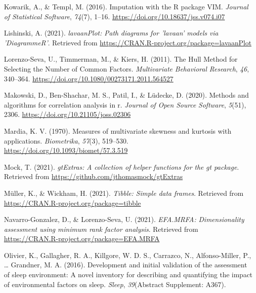 \documentclass[
  english,
  man]{apa6}
\newlength{\cslhangindent}
\newlength{\cslentryspacingunit} %
\newenvironment{CSLReferences}[2] %
 {%
  \setlength{\parindent}{0pt}
  \ifodd #1
  \let\oldpar\par
  \def\par{\hangindent=\cslhangindent\oldpar}
  \fi
  \setlength{\parskip}{#2\cslentryspacingunit}
 }%
 {}
\begin{document}
\begin{CSLReferences}{1}{0}
\leavevmode{}%
Kowarik, A., \& Templ, M. (2016). Imputation with the {R} package {VIM}. \emph{Journal of Statistical Software}, \emph{74}(7), 1--16. \url{https://doi.org/10.18637/jss.v074.i07}

\leavevmode{}%
Lishinski, A. (2021). \emph{lavaanPlot: Path diagrams for 'lavaan' models via 'DiagrammeR'}. Retrieved from \url{https://CRAN.R-project.org/package=lavaanPlot}

\leavevmode{}%
Lorenzo-Seva, U., Timmerman, M., \& Kiers, H. (2011). The {Hull Method} for {Selecting} the {Number} of {Common Factors}. \emph{Multivariate Behavioral Research}, \emph{46}, 340--364. \url{https://doi.org/10.1080/00273171.2011.564527}

\leavevmode{}%
Makowski, D., Ben-Shachar, M. S., Patil, I., \& Lüdecke, D. (2020). Methods and algorithms for correlation analysis in r. \emph{Journal of Open Source Software}, \emph{5}(51), 2306. \url{https://doi.org/10.21105/joss.02306}

\leavevmode{}%
Mardia, K. V. (1970). Measures of multivariate skewness and kurtosis with applications. \emph{Biometrika}, \emph{57}(3), 519--530. \url{https://doi.org/10.1093/biomet/57.3.519}

\leavevmode{}%
Mock, T. (2021). \emph{gtExtras: A collection of helper functions for the gt package}. Retrieved from \url{https://github.com/jthomasmock/gtExtras}

\leavevmode{}%
Müller, K., \& Wickham, H. (2021). \emph{Tibble: Simple data frames}. Retrieved from \url{https://CRAN.R-project.org/package=tibble}

\leavevmode{}%
Navarro-Gonzalez, D., \& Lorenzo-Seva, U. (2021). \emph{EFA.MRFA: Dimensionality assessment using minimum rank factor analysis}. Retrieved from \url{https://CRAN.R-project.org/package=EFA.MRFA}

\leavevmode{}%
Olivier, K., Gallagher, R. A., Killgore, W. D. S., Carrazco, N., Alfonso-Miller, P., \ldots{} Grandner, M. A. (2016). Development and initial validation of the assessment of sleep environment: A novel inventory for describing and quantifying the impact of environmental factors on sleep. \emph{Sleep}, \emph{39}(Abstract Supplement: A367).


\end{CSLReferences}
\end{document}
